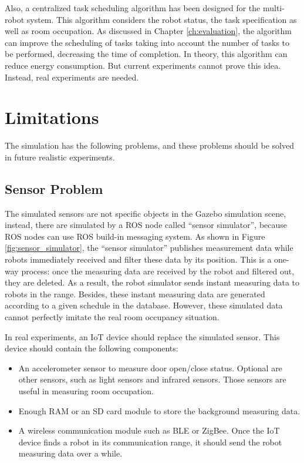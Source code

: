 Also, a centralized task scheduling algorithm has been designed for the multi-robot system. This algorithm considers the robot status, the task specification as well as room occupation. As discussed in Chapter \ref{ch:evaluation}, the algorithm can improve the scheduling of tasks taking into account the number of tasks to be performed, decreasing the time of completion. 
In theory, this algorithm can reduce energy consumption. But current experiments cannot prove this idea. Instead, real experiments are needed.

\section{Limitations}
\label{sec:limitations} 

The simulation has the following problems, and these problems should be solved in future realistic experiments.

\subsection*{Sensor Problem}

The simulated sensors are not specific objects in the Gazebo simulation scene, instead, there are simulated by a ROS node called ``sensor simulator'', because ROS nodes can use ROS build-in messaging system. As shown in Figure \ref{fig:sensor_simulator}, the ``sensor simulator'' publishes measurement data while robots immediately received and filter these data by its position. This is a one-way process: once the measuring data are received by the robot and filtered out, they are deleted. 
As a result, the robot simulator sends instant measuring data to robots in the range. 
Besides, these instant measuring data are generated according to a given schedule in the database. However, these simulated data cannot perfectly imitate the real room occupancy situation.

In real experiments, an IoT device should replace the simulated sensor. This device should contain the following components:
 \begin{itemize}
 \item An accelerometer sensor to measure door open/close status. Optional are other sensors, such as light sensors and infrared sensors. Those sensors are useful in measuring room occupation. 
 \item Enough RAM or an SD card module to store the background measuring data.
 \item A wireless communication module such as BLE or ZigBee. Once the IoT device finds a robot in its communication range, it should send the robot measuring data over a while.
 \end{itemize}
 
